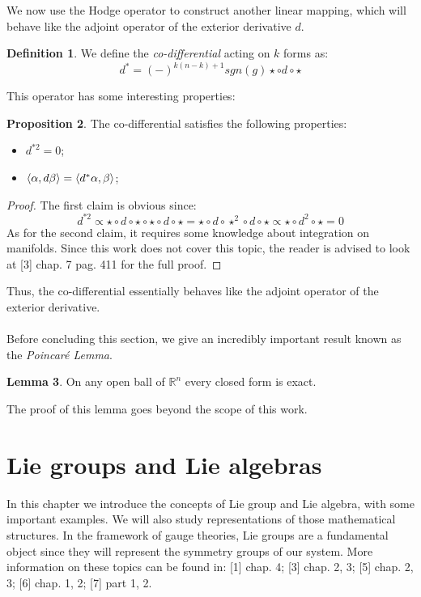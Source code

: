 \documentclass[12pt,a4paper]{report}
\theoremstyle{definition}
\newtheorem{Def}{Definition}[chapter]
\theoremstyle{Theorem}
\newtheorem{Prop}[Def]{Proposition}
\newtheorem{Lm}[Def]{Lemma}
\theoremstyle{definition}
\theoremstyle{definition}
\begin{document}
	We now use the Hodge operator to construct another linear mapping, which will behave like the adjoint operator of the exterior derivative $d$.
	\begin{Def}
		We define the \textit{co-differential} acting on $k$ forms as:
		$$d^*=(-)^{k(n-k)+1}sgn(g)\star \circ  d\circ\star$$
	\end{Def}
	This operator has some interesting properties:
	\begin{Prop}
		The co-differential satisfies the following properties:
		\begin{itemize}
			\item $d^{*2}=0$;
			\item $\braket{\alpha,d\beta}=\braket{d^*\alpha,\beta}$;
		\end{itemize}
	\end{Prop}
	\begin{proof}
		The first claim is obvious since:
		$$d^{*2}\propto\star \circ  d\circ\star\circ\star \circ  d\circ\star=\star \circ  d\circ\star^2\circ  d\circ\star\propto\star\circ d^2\circ\star=0$$
		As for the second claim, it requires some knowledge about integration on manifolds. Since this work does not cover this topic, the reader is advised to look at [3] chap. 7 pag. 411 for the full proof.
	\end{proof}
	Thus, the co-differential essentially behaves like the adjoint operator of the exterior derivative.\\
	\\
	Before concluding this section, we give an incredibly important result known as the \textit{Poincaré Lemma}.
	\begin{Lm}\label{P.L.}
		On any open ball of $\mathbb{R}^n$ every closed form is exact.
	\end{Lm}
	The proof of this lemma goes beyond the scope of this work.
	\chapter{Lie groups and Lie algebras}
	In this chapter we introduce the concepts of Lie group and Lie algebra, with some important examples. We will also study representations of those mathematical structures. In the framework of gauge theories, Lie groups are a fundamental object since they will represent the symmetry groups of our system. More information on these topics can be found in:
	[1] chap. 4; [3] chap. 2, 3; [5] chap. 2, 3; [6] chap. 1, 2; [7] part 1, 2.
\end{document}
